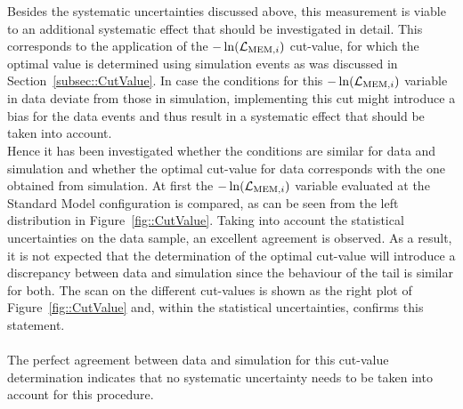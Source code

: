 Besides the systematic uncertainties discussed above, this measurement is viable to an additional systematic effect that should be investigated in detail.
This corresponds to the application of the $-\ln(\mathcal{L}_{\textrm{MEM}, i})$ cut-value, for which the optimal value is determined using simulation events as was discussed in Section~\ref{subsec::CutValue}.
In case the conditions for this $-\ln(\mathcal{L}_{\textrm{MEM}, i})$ variable in data deviate from those in simulation, implementing this cut might introduce a bias for the data events and thus result in a systematic effect that should be taken into account.
\\
Hence it has been investigated whether the conditions are similar for data and simulation and whether the optimal cut-value for data corresponds with the one obtained from simulation.
At first the $-\ln(\mathcal{L}_{\textrm{MEM}, i})$ variable evaluated at the Standard Model configuration is compared, as can be seen from the left distribution in Figure~\ref{fig::CutValue}.
Taking into account the statistical uncertainties on the data sample, an excellent agreement is observed. 
As a result, it is not expected that the determination of the optimal cut-value will introduce a discrepancy between data and simulation since the behaviour of the tail is similar for both.
The scan on the different cut-values is shown as the right plot of Figure~\ref{fig::CutValue} and, within the statistical uncertainties, confirms this statement.
\\
\\
The perfect agreement between data and simulation for this cut-value determination indicates that no systematic uncertainty needs to be taken into account for this procedure.
